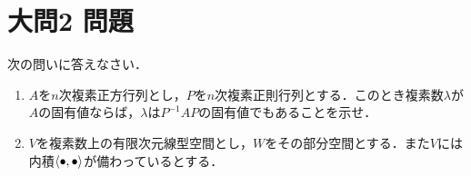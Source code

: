 \documentclass[dvipdfmx]{jsreport}
\begin{document}
\section{大問2 問題}
\begin{tcolorbox} %
	次の問いに答えなさい．
\begin{enumerate}
	\item $A$を$n$次複素正方行列とし，$P$を$n$次複素正則行列とする．このとき複素数$\lambda$が$A$の固有値ならば，$\lambda$は$P^{-1}AP$の固有値でもあることを示せ．
	\item $V$を複素数上の有限次元線型空間とし，$W$をその部分空間とする．また$V$には内積$\left\langle{\bullet}, {\bullet}\right\rangle$が備わっているとする．
\end{enumerate}
\end{tcolorbox}
\end{document}
